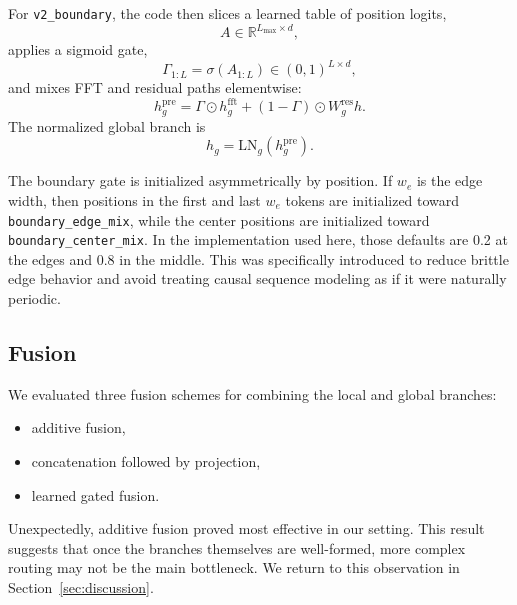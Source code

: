 \documentclass[11pt]{article}
\begin{document}
For \texttt{v2\_boundary}, the code then slices a learned table of position logits,
\begin{equation}
    A \in \mathbb{R}^{L_{\max} \times d},
\end{equation}
applies a sigmoid gate,
\begin{equation}
    \Gamma_{1:L} = \sigma(A_{1:L}) \in (0,1)^{L \times d},
\end{equation}
and mixes FFT and residual paths elementwise:
\begin{equation}
    h_{g}^{\mathrm{pre}} = \Gamma \odot h_{g}^{\mathrm{fft}} + (1-\Gamma)\odot W_{g}^{\mathrm{res}} h.
\end{equation}
The normalized global branch is
\begin{equation}
    h_g = \mathrm{LN}_{g}(h_{g}^{\mathrm{pre}}).
\end{equation}

The boundary gate is initialized asymmetrically by position. If $w_e$ is the edge width, then positions in the first and last $w_e$ tokens are initialized toward \texttt{boundary\_edge\_mix}, while the center positions are initialized toward \texttt{boundary\_center\_mix}. In the implementation used here, those defaults are 0.2 at the edges and 0.8 in the middle. This was specifically introduced to reduce brittle edge behavior and avoid treating causal sequence modeling as if it were naturally periodic.

\subsection{Fusion}
We evaluated three fusion schemes for combining the local and global branches:
\begin{itemize}[leftmargin=1.5em]
    \item additive fusion,
    \item concatenation followed by projection,
    \item learned gated fusion.
\end{itemize}

Unexpectedly, additive fusion proved most effective in our setting. This result suggests that once the branches themselves are well-formed, more complex routing may not be the main bottleneck. We return to this observation in Section~\ref{sec:discussion}.
\end{document}
